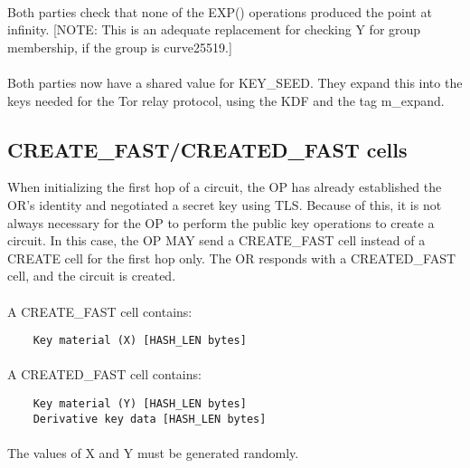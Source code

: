 \paragraph{}
Both parties check that none of the EXP() operations produced the
point at infinity. [NOTE: This is an adequate replacement for
checking Y for group membership, if the group is curve25519.]

\paragraph{}
Both parties now have a shared value for KEY\_SEED. They expand this
into the keys needed for the Tor relay protocol, using the KDF
 and the tag m\_expand.

\subsection{CREATE\_FAST/CREATED\_FAST cells}
When initializing the first hop of a circuit, the OP has already
established the OR's identity and negotiated a secret key using TLS.
Because of this, it is not always necessary for the OP to perform the
public key operations to create a circuit. In this case, the
OP MAY send a CREATE\_FAST cell instead of a CREATE cell for the first
hop only. The OR responds with a CREATED\_FAST cell, and the circuit is
created.

\paragraph{}
A CREATE\_FAST cell contains:

\begin{verbatim}
    Key material (X) [HASH_LEN bytes]
\end{verbatim}

\paragraph{}
A CREATED\_FAST cell contains:

\begin{verbatim}
    Key material (Y) [HASH_LEN bytes]
    Derivative key data [HASH_LEN bytes]
\end{verbatim}

\paragraph{}
The values of X and Y must be generated randomly.

